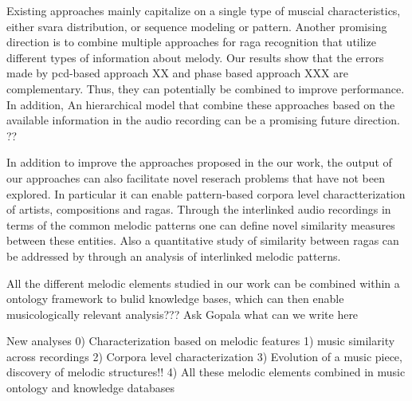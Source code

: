 Existing approaches mainly capitalize on a single type of muscial characteristics, either svara distribution, or sequence modeling or pattern. Another promising direction is to combine multiple approaches for \gls{raga} recognition that utilize different types of information about melody. Our results show that the errors made by pcd-based approach XX and phase based approach XXX  are complementary. Thus, they can potentially be combined to improve performance. In addition, An hierarchical model that combine these approaches based on the available information in the audio recording can be a promising future direction. ??

In addition to improve the approaches proposed in the our work, the output of our approaches can also facilitate novel reserach problems that have not been explored. In particular it can enable pattern-based corpora level charactterization of artists, compositions and ragas. Through the interlinked audio recordings in terms of the common melodic patterns one can define novel similarity measures between these entities. Also a quantitative study of similarity between ragas can be addressed by through an analysis of interlinked melodic patterns. 

All the different melodic elements studied in our work can be combined within a ontology framework to bulid knowledge bases, which can then enable musicologically relevant analysis??? Ask Gopala what can we write here



New analyses
0) Characterization based on melodic features
1) music similarity across recordings
2) Corpora level characterization 
3) Evolution of a music piece, discovery of melodic structures!!
4) All these melodic elements combined in music ontology and knowledge databases


%
